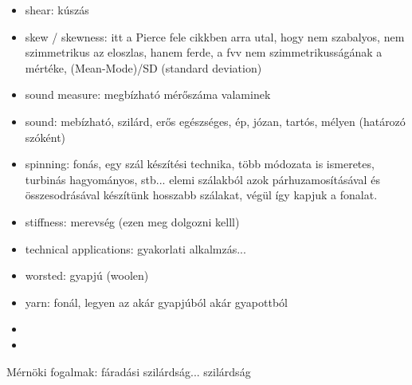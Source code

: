 \begin{itemize}
\item shear: kúszás
\item skew / skewness: itt a Pierce fele cikkben arra utal, hogy nem szabalyos, nem szimmetrikus az eloszlas, hanem ferde, a fvv nem szimmetrikusságának a mértéke, (Mean-Mode)/SD (standard deviation)
\item sound measure: megbízható mérőszáma valaminek
\item sound: mebízható, szilárd, erős egészséges, ép, józan, tartós, mélyen (határozó szóként)
\item spinning: fonás, egy szál készítési technika, több módozata is ismeretes, turbinás hagyományos, stb... elemi szálakból azok párhuzamosításával
és összesodrásával készítünk hosszabb szálakat, végül így kapjuk a fonalat.
\item stiffness: merevség (ezen meg dolgozni kelll)
\item technical applications: gyakorlati alkalmzás...
\item worsted: gyapjú (woolen)
\item yarn: fonál, legyen az akár gyapjúból akár gyapottból

\item
\item
\end{itemize}


Mérnöki fogalmak: fáradási szilárdság...
szilárdság
